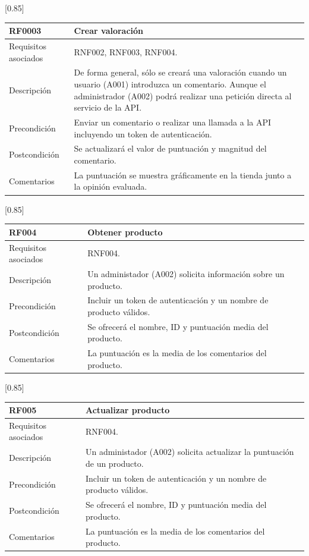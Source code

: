 \begin{table}[htbp]
  \centering
  \scalebox{0.85}[0.85] {
    \begin{tabular}{l p{32.145em}}
    \toprule
    \textbf{RF0003} & \textbf{Crear valoración} \\
    \midrule
    Requisitos asociados & RNF002, RNF003, RNF004. \\
    Descripción & De forma general, sólo se creará una valoración cuando un usuario (A001) introduzca un comentario. Aunque el administrador (A002) podrá realizar una petición directa al servicio de la API. \\
    Precondición & Enviar un comentario o realizar una llamada a la API incluyendo un token de autenticación. \\
    Postcondición & Se actualizará el valor de puntuación y magnitud del comentario. \\
    Comentarios & La puntuación se muestra gráficamente en la tienda junto a la opinión evaluada. \\
    \midrule
    \end{tabular}%
  }
  \label{tab:rf003}
\end{table}%

\begin{table}[htbp]
  \centering
  \scalebox{0.85}[0.85] {
    \begin{tabular}{l p{32.145em}}
    \toprule
    \textbf{RF004} & \textbf{Obtener producto} \\
    \midrule
    Requisitos asociados & RNF004. \\
    Descripción & Un administador (A002) solicita información sobre un producto. \\
    Precondición & Incluir un token de autenticación y un nombre de producto válidos. \\
    Postcondición & Se ofrecerá el nombre, ID y puntuación media del producto. \\
    Comentarios & La puntuación es la media de los comentarios del producto. \\
    \midrule
    \end{tabular}%
  }
  \label{tab:rf004}
\end{table}%

\begin{table}[htbp]
  \centering
  \scalebox{0.85}[0.85] {
    \begin{tabular}{l p{32.145em}}
    \toprule
    \textbf{RF005} & \textbf{Actualizar producto} \\
    \midrule
    Requisitos asociados & RNF004. \\
    Descripción & Un administador (A002) solicita actualizar la puntuación de un producto. \\
    Precondición & Incluir un token de autenticación y un nombre de producto válidos. \\
    Postcondición & Se ofrecerá el nombre, ID y puntuación media del producto. \\
    Comentarios & La puntuación es la media de los comentarios del producto. \\
    \midrule
    \end{tabular}%
  }
  \label{tab:rf005}
\end{table}%


